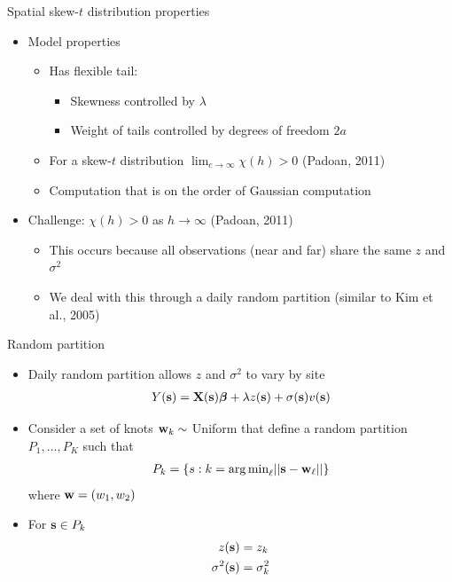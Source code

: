 \documentclass{beamer}
\begin{document}
\begin{frame}{Spatial skew-$t$ distribution properties}
  \begin{itemize} \setlength{\itemsep}{0.5em}
      \item Model properties
    \begin{itemize}
    	\item Has flexible tail:
      \begin{itemize}
        \item Skewness controlled by $\lambda$
        \item Weight of tails controlled by degrees of freedom $2a$
      \end{itemize}
    	\item For a skew-$t$ distribution $\lim_{c \rightarrow \infty} \chi(h) > 0$ (Padoan, 2011)
    	\item Computation that is on the order of Gaussian computation
    \end{itemize}
    \item Challenge: $\chi(h) > 0$ as $h \rightarrow \infty$ (Padoan, 2011)
    \begin{itemize}
      \item This occurs because all observations (near and far) share the same $z$ and $\sigma^2$
      \item We deal with this through a daily random partition (similar to Kim et al., 2005)
    \end{itemize}
  \end{itemize}
\end{frame}

\begin{frame}{Random partition}
  \begin{itemize} \setlength{\itemsep}{0.5em}
    \item Daily random partition allows $z$ and $\sigma^2$ to vary by site
    \begin{align*}
      Y(\mbox{\bf s}) = \mbox{\bf X}(\mbox{\bf s}) \mbox{\boldmath $\beta$} + \lambda z(\mbox{\bf s}) + \sigma(\mbox{\bf s}) v(\mbox{\bf s})
    \end{align*}
    \item Consider a set of knots $\mbox{\bf w}_{k} \sim$ Uniform that define a random partition
    $P_{1}, \ldots, P_{K}$ such that
    \begin{align*}
      P_{k} = \{s : k = {\mathop{\rm arg\, min}}_\ell|| \mbox{\bf s} - \mbox{\bf w}_{\ell}|| \}
    \end{align*}
    where $\mbox{\bf w} = (w_1, w_2)$
    \item For $\mbox{\bf s} \in P_{k}$
    \begin{align*}
      z(\mbox{\bf s}) &= z_{k}\\
      \sigma^2(\mbox{\bf s}) &= \sigma^2_{k}
    \end{align*}
  \end{itemize}
\end{frame}
\end{document}
